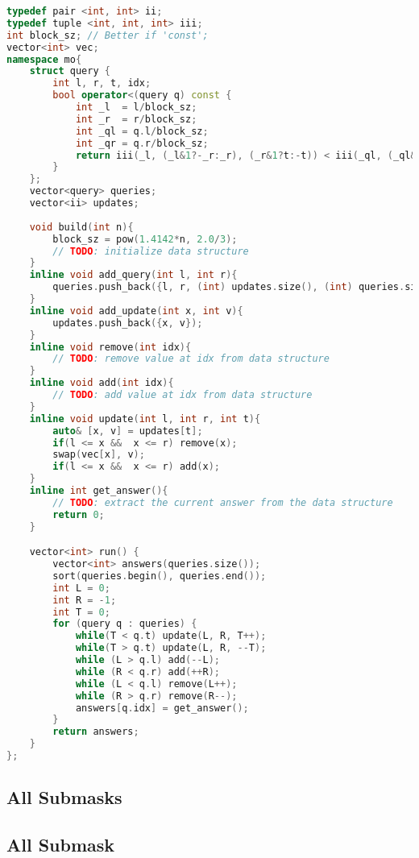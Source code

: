 \documentclass[11pt, a4paper, twoside]{article}
\begin{document}
\begin{lstlisting}[language=C++]
typedef pair <int, int> ii;
typedef tuple <int, int, int> iii;
int block_sz; // Better if 'const';
vector<int> vec;
namespace mo{
    struct query {
        int l, r, t, idx;
        bool operator<(query q) const {
            int _l  = l/block_sz;
            int _r  = r/block_sz;
            int _ql = q.l/block_sz;
            int _qr = q.r/block_sz;
            return iii(_l, (_l&1?-_r:_r), (_r&1?t:-t)) < iii(_ql, (_ql&1?-_qr:_qr), (_qr&1?q.t:-q.t));
        }
    };
    vector<query> queries;
    vector<ii> updates;
       
    void build(int n){
        block_sz = pow(1.4142*n, 2.0/3);
        // TODO: initialize data structure
    }
    inline void add_query(int l, int r){
        queries.push_back({l, r, (int) updates.size(), (int) queries.size()});
    }
    inline void add_update(int x, int v){
        updates.push_back({x, v});
    }
    inline void remove(int idx){
        // TODO: remove value at idx from data structure
    }
    inline void add(int idx){
        // TODO: add value at idx from data structure
    }
    inline void update(int l, int r, int t){
        auto& [x, v] = updates[t];
        if(l <= x &&  x <= r) remove(x);
        swap(vec[x], v);
        if(l <= x &&  x <= r) add(x);
    }
    inline int get_answer(){
        // TODO: extract the current answer from the data structure
        return 0;
    }

    vector<int> run() {
        vector<int> answers(queries.size());
        sort(queries.begin(), queries.end());
        int L = 0;
        int R = -1;
        int T = 0;
        for (query q : queries) {
            while(T < q.t) update(L, R, T++);
            while(T > q.t) update(L, R, --T);
            while (L > q.l) add(--L);
            while (R < q.r) add(++R);
            while (L < q.l) remove(L++);
            while (R > q.r) remove(R--);
            answers[q.idx] = get_answer(); 
        }
        return answers;
    }
};
\end{lstlisting}

\subsection{All Submasks}

\subsection{All Submask}
\end{document}
